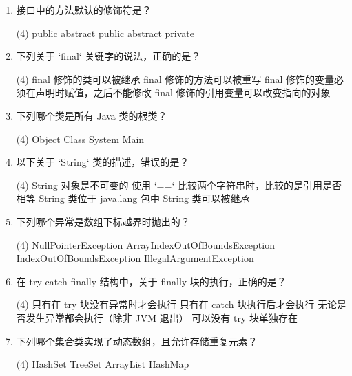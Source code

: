 \documentclass[a3paper, landscape, 11pt, twocolumn]{article}
\begin{document}
\begin{enumerate}[label=\arabic*., itemsep=0.8em]
	\item 接口中的方法默认的修饰符是？
	      \begin{tasks}(4)
		      \task public abstract \task public \task abstract \task private
	      \end{tasks}

	\item 下列关于 `final` 关键字的说法，正确的是？
	      \begin{tasks}(4)
		      \task final 修饰的类可以被继承
		      \task final 修饰的方法可以被重写
		      \task final 修饰的变量必须在声明时赋值，之后不能修改
		      \task final 修饰的引用变量可以改变指向的对象
	      \end{tasks}

	\item 下列哪个类是所有 Java 类的根类？
	      \begin{tasks}(4)
		      \task Object \task Class \task System \task Main
	      \end{tasks}

	\item 以下关于 `String` 类的描述，错误的是？
	      \begin{tasks}(4)
		      \task String 对象是不可变的
		      \task 使用 `==` 比较两个字符串时，比较的是引用是否相等
		      \task String 类位于 java.lang 包中
		      \task String 类可以被继承
	      \end{tasks}

	\item 下列哪个异常是数组下标越界时抛出的？
	      \begin{tasks}(4)
		      \task NullPointerException
		      \task ArrayIndexOutOfBoundsException
		      \task IndexOutOfBoundsException
		      \task IllegalArgumentException
	      \end{tasks}

	\item 在 try-catch-finally 结构中，关于 finally 块的执行，正确的是？
	      \begin{tasks}(4)
		      \task 只有在 try 块没有异常时才会执行
		      \task 只有在 catch 块执行后才会执行
		      \task 无论是否发生异常都会执行（除非 JVM 退出）
		      \task 可以没有 try 块单独存在
	      \end{tasks}

	\item 下列哪个集合类实现了动态数组，且允许存储重复元素？
	      \begin{tasks}(4)
		      \task HashSet \task TreeSet \task ArrayList \task HashMap
	      \end{tasks}


\end{enumerate}
\end{document}
